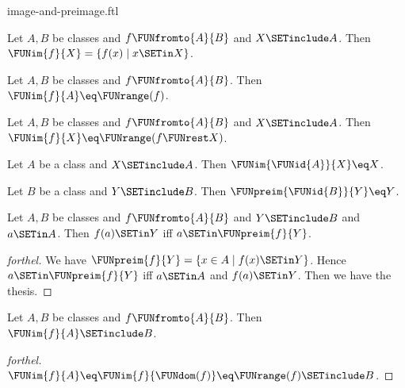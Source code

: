 \documentclass{naproche-library}
\begin{document}
\begin{smodule}[title=Computation Laws for Images and Preimages]{image-and-preimage.ftl}

\begin{proposition}[forthel,id=FOUNDATIONS_07_5919649206108160]
  Let $A, B$ be classes and $f \FUNfromto{A}{B}$ and $X \SETinclude A$.
  Then $\FUNim{f}{X} = \{ f(x) \mid x \SETin X \}$.
\end{proposition}

\begin{corollary}[forthel,id=FOUNDATIONS_07_5543924730953728]
  Let $A, B$ be classes and $f \FUNfromto{A}{B}$.
  Then $\FUNim{f}{A} \eq \FUNrange(f)$.
\end{corollary}

\begin{corollary}[forthel,id=FOUNDATIONS_07_1818812171157504]
  Let $A, B$ be classes and $f \FUNfromto{A}{B}$ and $X \SETinclude A$.
  Then $\FUNim{f}{X} \eq \FUNrange(f \FUNrest X)$.
\end{corollary}

\begin{proposition}[forthel,id=FOUNDATIONS_07_911395830890496]
  Let $A$ be a class and $X \SETinclude A$.
  Then $\FUNim{\FUNid{A}}{X} \eq X$.
\end{proposition}

\begin{proposition}[forthel,id=FOUNDATIONS_07_3349817830932480]
  Let $B$ be a class and $Y \SETinclude B$.
  Then $\FUNpreim{\FUNid{B}}{Y} \eq Y$.
\end{proposition}

\begin{proposition}[forthel,id=FOUNDATIONS_07_6362984433582080]
  Let $A, B$ be classes and $f \FUNfromto{A}{B}$ and $Y \SETinclude B$ and $a \SETin A$.
  Then $f(a) \SETin Y$ iff $a \SETin \FUNpreim{f}{Y}$.
\end{proposition}
\begin{proof}[forthel]
  We have $\FUNpreim{f}{Y} = \{ x \in A \mid f(x) \SETin Y \}$.
  Hence $a \SETin \FUNpreim{f}{Y}$ iff $a \SETin A$ and $f(a) \SETin Y$.
  Then we have the thesis.
\end{proof}

\begin{proposition}[forthel,id=FOUNDATIONS_07_6730546254184448]
  Let $A, B$ be classes and $f \FUNfromto{A}{B}$.
  Then $\FUNim{f}{A} \SETinclude B$.
\end{proposition}
\begin{proof}[forthel]
  $\FUNim{f}{A}
    \eq \FUNim{f}{\FUNdom(f)}
    \eq \FUNrange(f)
    \SETinclude B$.
\end{proof}


\end{smodule}
\end{document}
